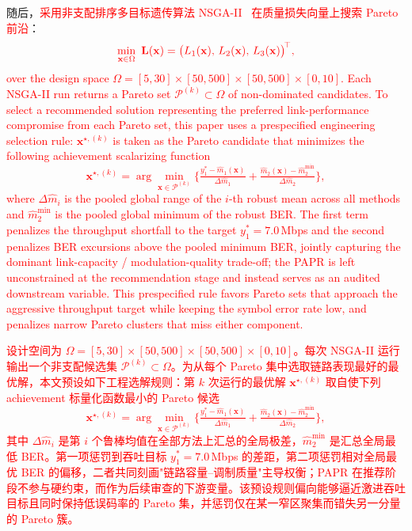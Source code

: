 \documentclass[11pt]{article}
\begin{document}
随后，\textcolor{red}{采用非支配排序多目标遗传算法 NSGA-II~\citep{Deb2002} 在质量损失向量上搜索 Pareto 前沿}：%
\begin{equation}
	\textcolor{red}{\min_{\mathbf{x}\in\Omega}\ \mathbf{L}(\mathbf{x}) = \bigl(L_{1}(\mathbf{x}),\, L_{2}(\mathbf{x}),\, L_{3}(\mathbf{x})\bigr)^{\!\top},}%
	\label{eq:opt_objective}
\end{equation}
\textcolor{red}{over the design space $\Omega=[5,30]\times[50,500]\times[50,500]\times[0,10]$. Each NSGA-II run returns a Pareto set $\mathcal{P}^{(k)}\subset\Omega$ of non-dominated candidates. To select a recommended solution representing the preferred link-performance compromise from each Pareto set, this paper uses a prespecified engineering selection rule: $\mathbf{x}^{\star,(k)}$ is taken as the Pareto candidate that minimizes the following achievement scalarizing function
\begin{equation*}
\mathbf{x}^{\star,(k)}=\arg\min_{\mathbf{x}\in\mathcal{P}^{(k)}}\Big\{\tfrac{y_{1}^{*}-\hat{m}_{1}(\mathbf{x})}{\Delta\hat{m}_{1}} + \tfrac{\hat{m}_{2}(\mathbf{x})-\hat{m}_{2}^{\min}}{\Delta\hat{m}_{2}}\Big\},
\end{equation*}
where $\Delta\hat{m}_{i}$ is the pooled global range of the $i$-th robust mean across all methods and $\hat{m}_{2}^{\min}$ is the pooled global minimum of the robust BER. The first term penalizes the throughput shortfall to the target $y_{1}^{*}=7.0$\,Mbps and the second penalizes BER excursions above the pooled minimum BER, jointly capturing the dominant link-capacity / modulation-quality trade-off; the PAPR is left unconstrained at the recommendation stage and instead serves as an audited downstream variable. This prespecified rule favors Pareto sets that approach the aggressive throughput target while keeping the symbol error rate low, and penalizes narrow Pareto clusters that miss either component.}%

\textcolor{red}{设计空间为 $\Omega=[5,30]\times[50,500]\times[50,500]\times[0,10]$。每次 NSGA-II 运行输出一个非支配候选集 $\mathcal{P}^{(k)}\subset\Omega$。为从每个 Pareto 集中选取链路表现最好的最优解，本文预设如下工程选解规则：第 $k$ 次运行的最优解 $\mathbf{x}^{\star,(k)}$ 取自使下列 achievement 标量化函数最小的 Pareto 候选
\begin{equation*}
\mathbf{x}^{\star,(k)}=\arg\min_{\mathbf{x}\in\mathcal{P}^{(k)}}\Big\{\tfrac{y_{1}^{*}-\hat{m}_{1}(\mathbf{x})}{\Delta\hat{m}_{1}} + \tfrac{\hat{m}_{2}(\mathbf{x})-\hat{m}_{2}^{\min}}{\Delta\hat{m}_{2}}\Big\},
\end{equation*}
其中 $\Delta\hat{m}_{i}$ 是第 $i$ 个鲁棒均值在全部方法上汇总的全局极差，$\hat{m}_{2}^{\min}$ 是汇总全局最低 BER。第一项惩罚到吞吐目标 $y_{1}^{*}=7.0$\,Mbps 的差距，第二项惩罚相对全局最优 BER 的偏移，二者共同刻画"链路容量--调制质量"主导权衡；PAPR 在推荐阶段不参与硬约束，而作为后续审查的下游变量。该预设规则偏向能够逼近激进吞吐目标且同时保持低误码率的 Pareto 集，并惩罚仅在某一窄区聚集而错失另一分量的 Pareto 簇。}%
\end{document}
